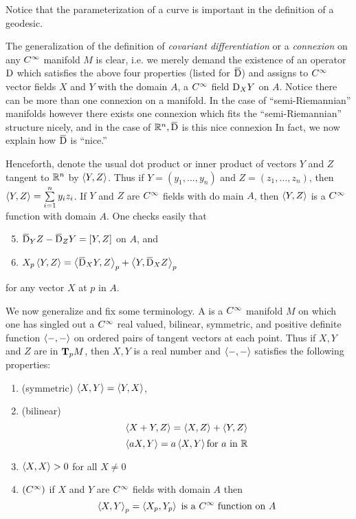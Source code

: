 \documentclass[../main]{subfiles}
\begin{document}
Notice that the parameterization of a curve is important in the definition of a geodesic.

The generalization of the definition of \emph{covariant differentiation} or a \emph{connexion} on any $\CInfty$ manifold $M$ is clear, i.e. we merely demand the existence of an operator $\connection$ which satisfies the above four properties (listed for $\covariant$) and assigns to $\CInfty$ vector fields $X$ and $Y$ with the domain $A$, a $\CInfty$ field $\connection_{X} Y$ on $A$. Notice there can be more than one connexion on a manifold. In the case of ``semi-Riemannian'' manifolds however there exists one connexion which fits the ``semi-Riemannian'' structure nicely, and in the case of $\bR^{n}, \covariant$ is this nice connexion In fact, we now explain how $\covariant$ is ``nice.''

Henceforth, denote the usual dot product or inner product of vectors $Y$ and $Z$ tangent to $\bR^{n}$ by $\ip{Y}{Z}$. Thus if $Y=(y_{1}, \ldots, y_{n})$ and $Z= (z_{1}, \ldots, z_{n})$, then $\ip{Y}{Z}=\sum\limits_{i=1}^{n} y_{i} z_{i}$. If $Y$ and $Z$ are $\CInfty$ fields with do main $A$, then $\ip{Y}{Z}$ is a $\CInfty$ function with domain $A$. One checks easily that
\begin{enumerate}[label = (\arabic*)]
    \setcounter{enumi}{4}
    \item \label{enu:ch02.1.5} $\covariant_{Y} Z-\covariant_{Z} Y=[Y, Z]$ on $A$, and 
    \item \label{enu:ch02.1.6}$X_{p}\ip{Y}{Z}=\ip{\covariant_{X} Y}{Z}_{p}+\ip{Y}{\covariant_X Z}_p$
\end{enumerate}
for any vector $X$ at $p$ in $A$.

We now generalize and fix some terminology. A  is a $\CInfty$ manifold $M$ on which one has singled out a $\CInfty$ real valued, bilinear, symmetric, and positive definite function $\ip{-}{-}$ on ordered pairs of tangent vectors at each point. Thus if $X,Y$ and $Z$ are in $\tangentspace{M}{p}$, then $X,Y$ is a real number and $\ip{-}{-}$ satisfies the following properties:

\begin{enumerate}[label=(\alph*)]
    \item(symmetric) $\ip{X}{Y}= \ip{Y}{X}$, \label{enu:ch02.1.a}
    \item (bilinear) \[\ip{X+Y}{Z} = \ip{X}{Z}+\ip{Y}{Z}\]\[ \ip{aX}{Y} = a\ip{X}{Y} \text{for }a\text{ in } \bR\]\label{enu:ch02.1.b}
    \item\label{enu:ch02.1.c} $\ip{X}{X} >0$ for all $X\neq 0$
    \item $(\CInfty)$ if $X$ and $Y$ are $\CInfty$ fields with domain $A$ then 
    \[\ip{X}{Y}_p = \ip{X_p}{Y_p}\text{ is a } \CInfty\text{ function on } A\]\label{enu:ch02.1.d}
\end{enumerate}
\end{document}
